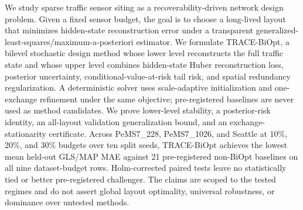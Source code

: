 We study sparse traffic sensor siting as a recoverability-driven network design problem. Given a fixed sensor budget, the goal is to choose a long-lived layout that minimizes hidden-state reconstruction error under a transparent generalized-least-squares/maximum-a-posteriori estimator. We formulate TRACE-BiOpt, a bilevel stochastic design method whose lower level reconstructs the full traffic state and whose upper level combines hidden-state Huber reconstruction loss, posterior uncertainty, conditional-value-at-risk tail risk, and spatial redundancy regularization. A deterministic solver uses scale-adaptive initialization and one-exchange refinement under the same objective; pre-registered baselines are never used as method candidates. We prove lower-level stability, a posterior-risk identity, an all-layout validation generalization bound, and an exchange-stationarity certificate. Across PeMS7\_228, PeMS7\_1026, and Seattle at 10\%, 20\%, and 30\% budgets over ten split seeds, TRACE-BiOpt achieves the lowest mean held-out GLS/MAP MAE against 21 pre-registered non-BiOpt baselines on all nine dataset-budget rows. Holm-corrected paired tests leave no statistically tied or better pre-registered challenger. The claims are scoped to the tested regimes and do not assert global layout optimality, universal robustness, or dominance over untested methods.
